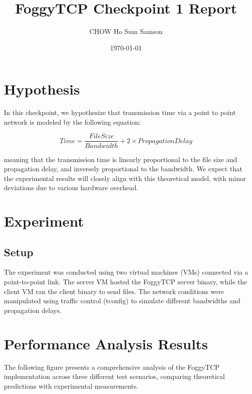 \documentclass[11pt,letterpaper]{article}
\title{FoggyTCP Checkpoint 1 Report}
\author{CHOW Ho Sum Samson}
\date{\today}
\begin{document}
\maketitle

\section{Hypothesis}

In this checkpoint, we hypothesize that transmission time via a point to point 
network is modeled by the following equation:

\begin{equation}
    Time = \frac{File Size}{Bandwidth} + 2 \times Propagation Delay
\end{equation}

meaning that the transmission time is linearly proportional to the file size and propagation delay,
 and inversely proportional to the bandwidth.
  We expect that the experimental results will closely align with this theoretical model,
   with minor deviations due to various hardware overhead.

\section{Experiment}    
\subsection{Setup}
The experiment was conducted using two virtual machines (VMs) connected via a point-to-point link.
 The server VM hosted the FoggyTCP server binary, while the client VM ran the client binary to send files.
  The network conditions were manipulated using traffic control (tconfig) to simulate different bandwidths and propagation delays.

\section{Performance Analysis Results}

The following figure presents a comprehensive analysis of the FoggyTCP implementation across three different test scenarios, comparing theoretical predictions with experimental measurements.
\end{document}
